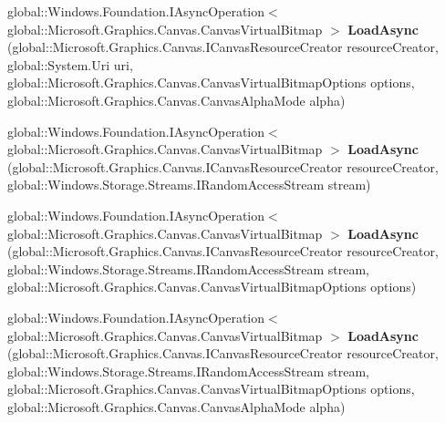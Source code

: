 \begin{DoxyCompactItemize}
\item 
\mbox{\label{interface_microsoft_1_1_graphics_1_1_canvas_1_1_i_canvas_virtual_bitmap_statics_ac1747ce10fe0cd80d92ea79b088c0fa3}} 
global\+::\+Windows.\+Foundation.\+I\+Async\+Operation$<$ global\+::\+Microsoft.\+Graphics.\+Canvas.\+Canvas\+Virtual\+Bitmap $>$ {\bfseries Load\+Async} (global\+::\+Microsoft.\+Graphics.\+Canvas.\+I\+Canvas\+Resource\+Creator resource\+Creator, global\+::\+System.\+Uri uri, global\+::\+Microsoft.\+Graphics.\+Canvas.\+Canvas\+Virtual\+Bitmap\+Options options, global\+::\+Microsoft.\+Graphics.\+Canvas.\+Canvas\+Alpha\+Mode alpha)
\item 
\mbox{\label{interface_microsoft_1_1_graphics_1_1_canvas_1_1_i_canvas_virtual_bitmap_statics_aee81585da1cf32d9da0d24e264902778}} 
global\+::\+Windows.\+Foundation.\+I\+Async\+Operation$<$ global\+::\+Microsoft.\+Graphics.\+Canvas.\+Canvas\+Virtual\+Bitmap $>$ {\bfseries Load\+Async} (global\+::\+Microsoft.\+Graphics.\+Canvas.\+I\+Canvas\+Resource\+Creator resource\+Creator, global\+::\+Windows.\+Storage.\+Streams.\+I\+Random\+Access\+Stream stream)
\item 
\mbox{\label{interface_microsoft_1_1_graphics_1_1_canvas_1_1_i_canvas_virtual_bitmap_statics_afcb7bb816ebb415ed059fda157c6bdca}} 
global\+::\+Windows.\+Foundation.\+I\+Async\+Operation$<$ global\+::\+Microsoft.\+Graphics.\+Canvas.\+Canvas\+Virtual\+Bitmap $>$ {\bfseries Load\+Async} (global\+::\+Microsoft.\+Graphics.\+Canvas.\+I\+Canvas\+Resource\+Creator resource\+Creator, global\+::\+Windows.\+Storage.\+Streams.\+I\+Random\+Access\+Stream stream, global\+::\+Microsoft.\+Graphics.\+Canvas.\+Canvas\+Virtual\+Bitmap\+Options options)
\item 
\mbox{\label{interface_microsoft_1_1_graphics_1_1_canvas_1_1_i_canvas_virtual_bitmap_statics_a60b2049c357c42be3e7dbccef1e43260}} 
global\+::\+Windows.\+Foundation.\+I\+Async\+Operation$<$ global\+::\+Microsoft.\+Graphics.\+Canvas.\+Canvas\+Virtual\+Bitmap $>$ {\bfseries Load\+Async} (global\+::\+Microsoft.\+Graphics.\+Canvas.\+I\+Canvas\+Resource\+Creator resource\+Creator, global\+::\+Windows.\+Storage.\+Streams.\+I\+Random\+Access\+Stream stream, global\+::\+Microsoft.\+Graphics.\+Canvas.\+Canvas\+Virtual\+Bitmap\+Options options, global\+::\+Microsoft.\+Graphics.\+Canvas.\+Canvas\+Alpha\+Mode alpha)

\end{DoxyCompactItemize}
